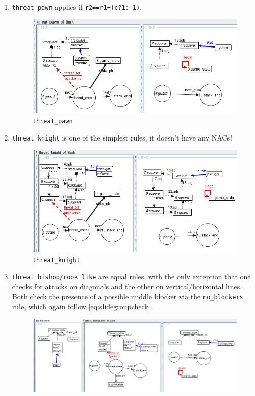 \documentclass[a4paper, 10pt]{scrartcl}
\begin{document}
    \begin{enumerate}
        \item \texttt{threat\_pawn} applies if \texttt{r2==r1+(c?1:-1)}.
        \begin{figure}[H]
            \centering
            \includegraphics[width=.8\linewidth]{images/threat_pawn.png}
            \caption{\texttt{threat\_pawn}}
        \end{figure}
        \item \texttt{threat\_knight} is one of the simplest rules, it doesn't have any NACs!
        \begin{figure}[H]
            \centering
            \includegraphics[width=.8\linewidth]{images/threat_knight.png}
            \caption{\texttt{threat\_knight}}
        \end{figure}
        \item \texttt{threat\_bishop/rook\_like} are equal rules, with the only exception that one checks for attacks on diagonals and the other on vertical/horizontal lines. Both check the presence of a possible middle blocker via the \texttt{no\_blockers} rule, which again follow \ref{eq:slidegroupcheck}.
        \begin{figure}[H]
            \centering
            \includegraphics[width=.8\linewidth]{images/threat_bishop_like.png}

\end{figure}
\end{enumerate}
\end{document}
